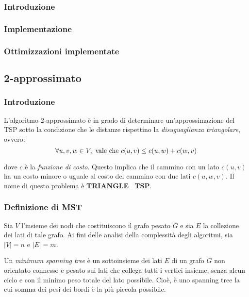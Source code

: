 \subsubsection{Introduzione}

\subsubsection{Implementazione}

\subsubsection{Ottimizzazioni implementate}

\subsection{2-approssimato}

\subsubsection{Introduzione}

L'algoritmo 2-approssimato è in grado di determinare un'approssimazione del TSP sotto la condizione che le
distanze rispettino la \textit{disuguaglianza triangolare}, ovvero:
\begin{equation}
    \forall u, v, w \in V, \textnormal{ vale che } c(u, v) \le c(u, w) + c(w, v)
\end{equation}

dove $c$ è la \textit{funzione di costo}. Questo implica che il cammino con un lato $c(u, v)$ ha un costo
minore o uguale al costo del cammino con due lati $c(u, w, v)$. Il nome di questo problema è \textbf{TRIANGLE\_TSP}.

\subsubsection{Definizione di MST}

Sia $V$ l'insieme dei nodi che costituiscono il grafo pesato $G$ e sia $E$ la collezione dei lati di tale
grafo. Ai fini delle analisi della complessità degli algoritmi, sia $|V| = n$ e $|E| = m$.

Un \textit{minimum spanning tree} è un
sottoinsieme dei lati $E$ di un grafo $G$ non orientato connesso e pesato sui lati che
collega tutti i vertici insieme, senza alcun ciclo e con il minimo peso totale del
lato possibile. Cioè, è uno spanning tree la cui somma dei pesi dei bordi è la più
piccola possibile.


